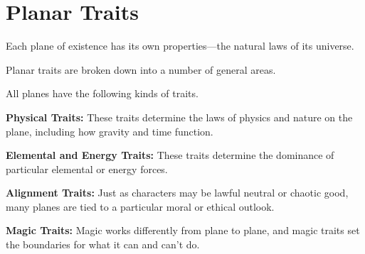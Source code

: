 \section{Planar Traits}
Each plane of existence has its own properties---the natural laws of its universe.

Planar traits are broken down into a number of general areas.

All planes have the following kinds of traits.

\textbf{Physical Traits:} These traits determine the laws of physics and nature on the plane, including how gravity and time function.

\textbf{Elemental and Energy Traits:} These traits determine the dominance of particular elemental or energy forces.

\textbf{Alignment Traits:} Just as characters may be lawful neutral or chaotic good, many planes are tied to a particular moral or ethical outlook.

\textbf{Magic Traits:} Magic works differently from plane to plane, and magic traits set the boundaries for what it can and can't do.





